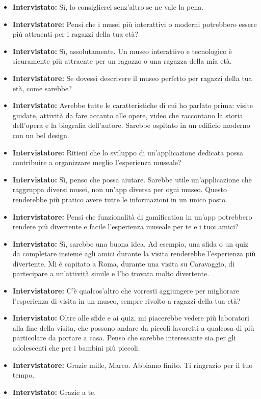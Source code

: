 \documentclass{article}
\begin{document}
\begin{itemize}
    \item \textbf{Intervistato:} Sì, lo consiglierei senz’altro se ne vale la pena.

    \item \textbf{Intervistatore:} Pensi che i musei più interattivi o moderni potrebbero essere più attraenti per i ragazzi della tua età?

    \item \textbf{Intervistato:} Sì, assolutamente. Un museo interattivo e tecnologico è sicuramente più attraente per un ragazzo o una ragazza della mia età.

    \item \textbf{Intervistatore:} Se dovessi descrivere il museo perfetto per ragazzi della tua età, come sarebbe?

    \item \textbf{Intervistato:} Avrebbe tutte le caratteristiche di cui ho parlato prima: visite guidate, attività da fare accanto alle opere, video che raccontano la storia dell’opera e la biografia dell’autore. Sarebbe ospitato in un edificio moderno con un bel design.

    \item \textbf{Intervistatore:} Ritieni che lo sviluppo di un’applicazione dedicata possa contribuire a organizzare meglio l’esperienza museale?

    \item \textbf{Intervistato:} Sì, penso che possa aiutare. Sarebbe utile un’applicazione che raggruppa diversi musei, non un’app diversa per ogni museo. Questo renderebbe più pratico avere tutte le informazioni in un unico posto.

    \item \textbf{Intervistatore:} Pensi che funzionalità di gamification in un’app potrebbero rendere più divertente e facile l’esperienza museale per te e i tuoi amici?

    \item \textbf{Intervistato:} Sì, sarebbe una buona idea. Ad esempio, una sfida o un quiz da completare insieme agli amici durante la visita renderebbe l’esperienza più divertente. Mi è capitato a Roma, durante una visita su Caravaggio, di partecipare a un’attività simile e l’ho trovata molto divertente.

    \item \textbf{Intervistatore:} C’è qualcos’altro che vorresti aggiungere per migliorare l’esperienza di visita in un museo, sempre rivolto a ragazzi della tua età?

    \item \textbf{Intervistato:} Oltre alle sfide e ai quiz, mi piacerebbe vedere più laboratori alla fine della visita, che possono andare da piccoli lavoretti a qualcosa di più particolare da portare a casa. Penso che sarebbe interessante sia per gli adolescenti che per i bambini più piccoli.

    \item \textbf{Intervistatore:} Grazie mille, Marco. Abbiamo finito. Ti ringrazio per il tuo tempo.

    \item \textbf{Intervistato:} Grazie a te.

\end{itemize}
\end{document}
